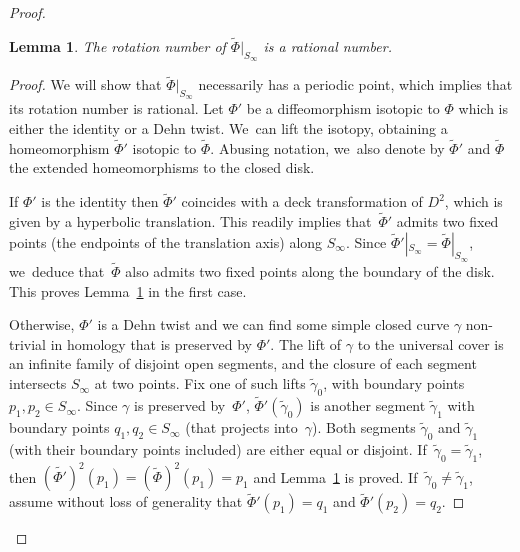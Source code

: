 \documentclass[JEP,XML,SOM,Unicode,NoEqCountersInSection,NoFloatCountersInSection,published]{cedram}
\newtheorem{lemma}[theorem]{Lemma}
\theoremstyle{definition}
\begin{document}
\begin{proof}
\begin{lemma}\label{lemma: rational}
The rotation number of $\widetilde{\Phi}|_{S_\infty}$ is a rational number.
\end{lemma}

\begin{proof}
We will show that $\widetilde{\Phi}|_{S_\infty}$ necessarily has a periodic point, which implies that its rotation number is rational. Let $\Phi'$ be a diffeomorphism isotopic to $\Phi$ which is either the identity or a Dehn twist. We~can lift the isotopy, obtaining a homeomorphism $\widetilde \Phi'$ isotopic to $\widetilde \Phi$. Abusing notation, we~also denote by $\widetilde \Phi'$ and $\widetilde \Phi$ the extended homeomorphisms to the closed disk.

If $\Phi'$ is the identity then $\widetilde \Phi'$ coincides with a deck transformation of $D^2$, which is given by a hyperbolic translation. This readily implies that~$\widetilde \Phi'$ admits two fixed points (the endpoints of the translation axis) along $S_\infty$. Since $\widetilde \Phi'|_{S_\infty}=\widetilde \Phi|_{S_\infty}$, we~deduce that~$\widetilde \Phi$ also admits two fixed points along the boundary of the disk. This proves Lemma~\ref{lemma: rational} in the first case.

Otherwise, $\Phi'$ is a Dehn twist and we can find some simple closed curve $\gamma$ non-trivial in homology that is preserved by $\Phi'$. The lift of $\gamma$ to the universal cover is an infinite family of disjoint open segments, and the closure of each segment intersects $S_\infty$ at two points. Fix one of such lifts $\widetilde \gamma_0$, with boundary points $p_1,p_2 \in S_\infty$. Since $\gamma$ is preserved by~$\Phi'$, $\widetilde \Phi'(\widetilde \gamma_0)$ is another segment $\widetilde \gamma_1$ with boundary points $q_1, q_2 \in S_\infty$ (that projects into~$\gamma$). Both segments $\widetilde \gamma_0$ and $\widetilde \gamma_1$ (with their boundary points included) are either equal or disjoint. If~$\widetilde{\gamma}_0=\widetilde{\gamma}_1$, then $(\widetilde{\Phi'})^2(p_1)=(\widetilde{\Phi})^2(p_1)=p_1$ and Lemma~\ref{lemma: rational} is proved. If~$\widetilde{\gamma}_0\neq \widetilde{\gamma}_1$, assume without loss of generality that $\widetilde \Phi'(p_1)=q_1$ and $\widetilde \Phi'(p_2)=q_2$.


\end{proof}
\end{proof}
\end{document}
